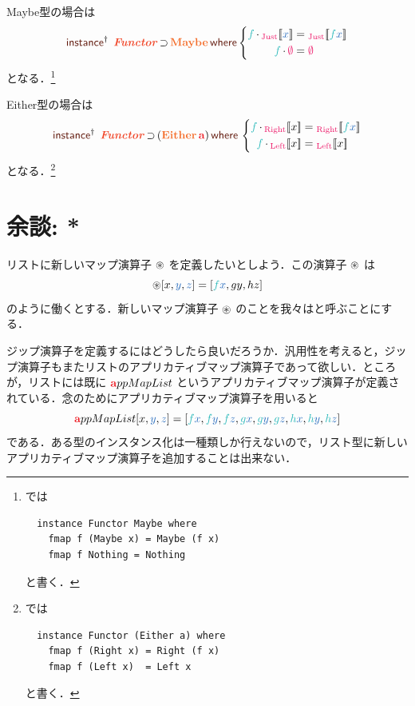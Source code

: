 \documentclass[a5paper,twoside,fleqn,draft]{jsbook}
\begin{document}
Maybe型の場合は
\begin{equation}
  \mInstanceDeclPolymorphic\;
  \mFunctorTypeClass\hHasElementsOf\hMaybe
  \mWhere\left\{
  \begin{aligned}
    \hFunc{f}\mMap{}\hJustWith{\hVar{x}}&=\hJustWith{\hFunc{f}\hVar{x}}\\
    \hFunc{f}\mMap\hNothing&=\hNothing
  \end{aligned}
  \right.
\end{equation}
となる．\footnote{\haskell では
\begin{verbatim}
  instance Functor Maybe where
    fmap f (Maybe x) = Maybe (f x)
    fmap f Nothing = Nothing
\end{verbatim}
と書く．}

Either型の場合は
\begin{equation}
  \mInstanceDeclPolymorphic\;
  \mFunctorTypeClass\hHasElementsOf{}(\hEither\,\hTypeName{a})
  \mWhere{}
  \left\{
  \begin{aligned}
    \hFunc{f}\mMap{}\hRightWith{x}&=\hRightWith{\hFunc{f}\hVar{x}}\\
    \hFunc{f}\mMap{}\hLeftWith{x}&=\hLeftWith{x}
  \end{aligned}
  \right.
\end{equation}
となる．\footnote{\haskell では
\begin{verbatim}
  instance Functor (Either a) where
    fmap f (Right x) = Right (f x)
    fmap f (Left x)  = Left x
\end{verbatim}
と書く．}


\section{余談: *}

リストに新しいマップ演算子 $\operatorname{\circledast}$ を定義したいとしよう．この演算子 $\operatorname{\circledast}$ は
\begin{equation}
  [\hFunc{f},\hFunc{g},\mHFunc]\mZip[x,\hVar{y},\hVar{z}]
  =[\hFunc{f}\hVar{x},gy,hz]
\end{equation}
のように働くとする．新しいマップ演算子 $\operatorname{\circledast}$ のことを我々はと呼ぶことにする．

ジップ演算子を定義するにはどうしたら良いだろうか．汎用性を考えると，ジップ演算子もまたリストのアプリカティブマップ演算子であって欲しい．ところが，リストには既に $\hTypeName{a}ppMapList$ というアプリカティブマップ演算子が定義されている．念のためにアプリカティブマップ演算子を用いると
\begin{equation}
  [\hFunc{f},\hFunc{g},\mHFunc]\hTypeName{a}ppMapList[x,\hVar{y},\hVar{z}]
  =[\hFunc{f}\hVar{x},\hFunc{f}\hVar{y},\hFunc{f}\hVar{z},\hFunc{g}\hVar{x},\hFunc{g}\hVar{y},\hFunc{g}\hVar{z},\mHFunc\hVar{x},\mHFunc\hVar{y},\mHFunc\hVar{z}]
\end{equation}
である．ある型のインスタンス化は一種類しか行えないので，リスト型に新しいアプリカティブマップ演算子を追加することは出来ない．
\end{document}
